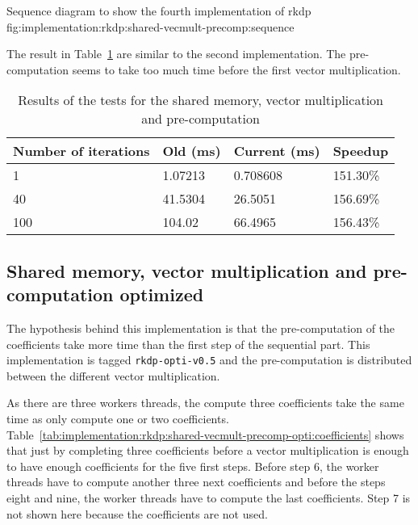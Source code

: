 {Sequence diagram to show the fourth implementation of \acrshort{rkdp}}
{fig:implementation:rkdp:shared-vecmult-precomp:sequence}

The result in Table~\ref{tab:implementation:rkdp:shared-vecmult-pre-computed:results}
are similar to the second implementation.
The pre-computation seems to take too much time before the first vector
multiplication.

\begin{table}[ht]
    \centering
    \begin{tabular}{|l|l|l|l|}
        \hline
        \textbf{Number of iterations} & \textbf{Old (ms)} & \textbf{Current (ms)} & \textbf{Speedup} \\
        \hline
        1 & 1.07213 & 0.708608 & 151.30\% \\
        \hline
        40 & 41.5304 & 26.5051 & 156.69\% \\
        \hline
        100 & 104.02 & 66.4965 & 156.43\% \\
        \hline
    \end{tabular}
    \caption{Results of the tests for the shared memory, vector multiplication and pre-computation}
    \label{tab:implementation:rkdp:shared-vecmult-pre-computed:results}
\end{table}


\subsection{Shared memory, vector multiplication and pre-computation optimized}
\label{ch:implementation:rkdp:shared-vecmult-precomp-opti}

The hypothesis behind this implementation is that the pre-computation of the
coefficients take more time than the first step of the sequential part.
This implementation is tagged \texttt{rkdp-opti-v0.5} and the pre-computation is
distributed between the different vector multiplication.

As there are three workers threads, the compute three coefficients take the same
time as only compute one or two coefficients.
Table~\ref{tab:implementation:rkdp:shared-vecmult-precomp-opti:coefficients}
shows that just by completing three coefficients before a vector multiplication
is enough to have enough coefficients for the five first steps.
Before step 6, the worker threads have to compute another three next
coefficients and before the steps eight and nine, the worker threads have to
compute the last coefficients.
Step 7 is not shown here because the coefficients are not used.

